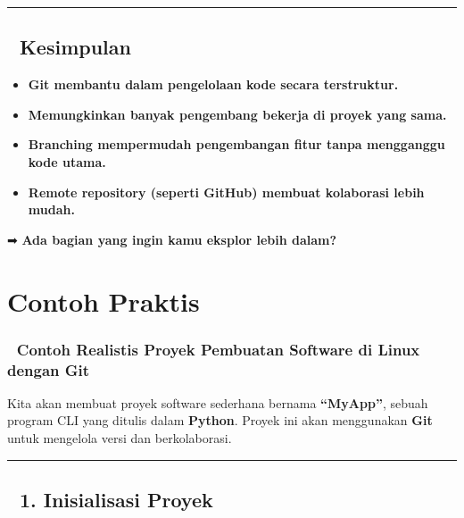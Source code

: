 \documentclass[
  letterpaper,
  DIV=11,
  numbers=noendperiod]{scrreprt}
\providecommand{\tightlist}{%
  \setlength{\itemsep}{0pt}\setlength{\parskip}{0pt}}\usepackage{longtable,booktabs,array}
\begin{document}
\begin{center}\rule{0.5\linewidth}{0.5pt}\end{center}

\section{\texorpdfstring{🎯
\textbf{Kesimpulan}}{🎯 Kesimpulan}}\label{kesimpulan}

\begin{itemize}
\tightlist
\item
  \textbf{Git membantu dalam pengelolaan kode secara terstruktur.}
\item
  \textbf{Memungkinkan banyak pengembang bekerja di proyek yang sama.}
\item
  \textbf{Branching mempermudah pengembangan fitur tanpa mengganggu kode
  utama.}
\item
  \textbf{Remote repository (seperti GitHub) membuat kolaborasi lebih
  mudah.}
\end{itemize}

➡ \textbf{Ada bagian yang ingin kamu eksplor lebih dalam?} 🚀


\chapter{Contoh Praktis}\label{contoh-praktis}

\subsection{\texorpdfstring{📌 \textbf{Contoh Realistis Proyek Pembuatan
Software di Linux dengan
Git}}{📌 Contoh Realistis Proyek Pembuatan Software di Linux dengan Git}}\label{contoh-realistis-proyek-pembuatan-software-di-linux-dengan-git}

Kita akan membuat proyek software sederhana bernama \textbf{``MyApp''},
sebuah program CLI yang ditulis dalam \textbf{Python}. Proyek ini akan
menggunakan \textbf{Git} untuk mengelola versi dan berkolaborasi.

\begin{center}\rule{0.5\linewidth}{0.5pt}\end{center}

\section{\texorpdfstring{🔹 \textbf{1. Inisialisasi
Proyek}}{🔹 1. Inisialisasi Proyek}}\label{inisialisasi-proyek}
\end{document}
